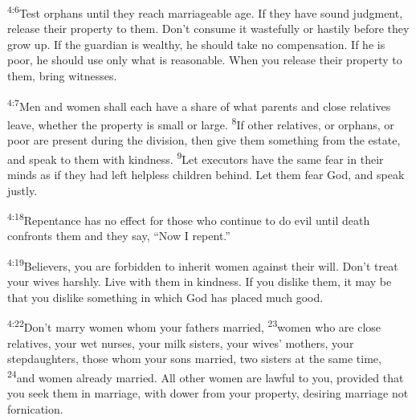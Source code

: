 \documentclass[openany,12pt,english]{book}
\newenvironment{para}{\par\pretolerance=100\tolerance=200\setlength{\emergencystretch}{0.6em}\relax}{\par}
\begin{document}
\begin{para}
    \textsuperscript{4:6}\thinspace{}Test orphans un\-til they reach mar\-riage\-a\-ble age. If they have sound judg\-ment, re\-lease their prop\-er\-ty to them. Don't con\-sume it wastefully or hast\-i\-ly be\-fore they grow up. If the guard\-i\-an is wealth\-y, he should take no com\-pen\-sa\-tion. If he is poor, he should use on\-ly what is rea\-son\-a\-ble. When you re\-lease their prop\-er\-ty to them, bring witnesses.
\end{para}

\begin{para}
    \textsuperscript{4:7}\thinspace{}Men and wom\-en shall each have a share of what parents and close relatives leave, wheth\-er the prop\-er\-ty is small or large.
    \textsuperscript{8}\thinspace{}If oth\-er relatives, or orphans, or poor are pres\-ent dur\-ing the di\-vi\-sion, then give them some\-thing from the es\-tate, and speak to them with kind\-ness.
    \textsuperscript{9}\thinspace{}Let executors have the same fear in their minds as if they had left help\-less chil\-dren be\-hind. Let them fear God, and speak just\-ly.
\end{para}

\begin{para}
    \textsuperscript{4:18}\thinspace{}Re\-pent\-ance has no ef\-fect for those who con\-tin\-ue to do evil un\-til death confronts them and they say, “Now I re\-pent.”
\end{para}

\begin{para}
    \textsuperscript{4:19}\thinspace{}Believers, you are for\-bid\-den to in\-her\-it wom\-en a\-gainst their will. Don't treat your wives harsh\-ly. Live with them in kind\-ness. If you dis\-like them, it may be that you dis\-like some\-thing in which God has placed much good.
\end{para}

\begin{para}
    \textsuperscript{4:22}\thinspace{}Don't mar\-ry wom\-en whom your fathers mar\-ried,
    \textsuperscript{23}\thinspace{}wom\-en who are close relatives, your wet nurses, your milk sisters, your wives' mothers, your stepdaughters, those whom your sons mar\-ried, two sisters at the same time,
    \textsuperscript{24}\thinspace{}and wom\-en al\-read\-y mar\-ried. All oth\-er wom\-en are law\-ful to you, pro\-vid\-ed that you seek them in mar\-riage, with dow\-er from your prop\-er\-ty, de\-sir\-ing mar\-riage not for\-ni\-ca\-tion.
\end{para}
\end{document}
